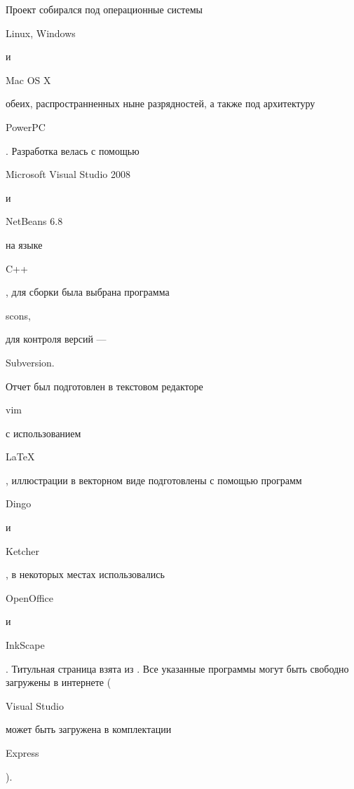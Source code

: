 Проект собирался под операционные системы \begin{tt}Linux, Windows\end{tt} и \begin{tt}Mac OS X\end{tt} обеих, распространненных ныне разрядностей, а также под архитектуру \begin{tt}PowerPC\end{tt}. Разработка велась с помощью \begin{tt}Microsoft Visual Studio 2008\end{tt} и \begin{tt}NetBeans 6.8\end{tt} на языке \begin{tt}C++\end{tt}, для сборки была выбрана программа \begin{tt}scons,\end{tt} для контроля версий --- \begin{tt}Subversion.\end{tt} Отчет был подготовлен в текстовом редакторе \begin{tt}vim\end{tt} с использованием \begin{tt}\LaTeX\end{tt}, иллюстрации в векторном виде подготовлены с помощью программ \begin{tt}Dingo\end{tt} и \begin{tt}Ketcher\end{tt}, в некоторых местах использовались \begin{tt}OpenOffice\end{tt} и \begin{tt}InkScape\end{tt}. Титульная страница взята из \cite[стр.26]{gluhov}. Все указанные программы могут быть свободно загружены в интернете (\begin{tt}Visual Studio\end{tt} может быть загружена в комплектации \begin{tt}Express\end{tt}).

